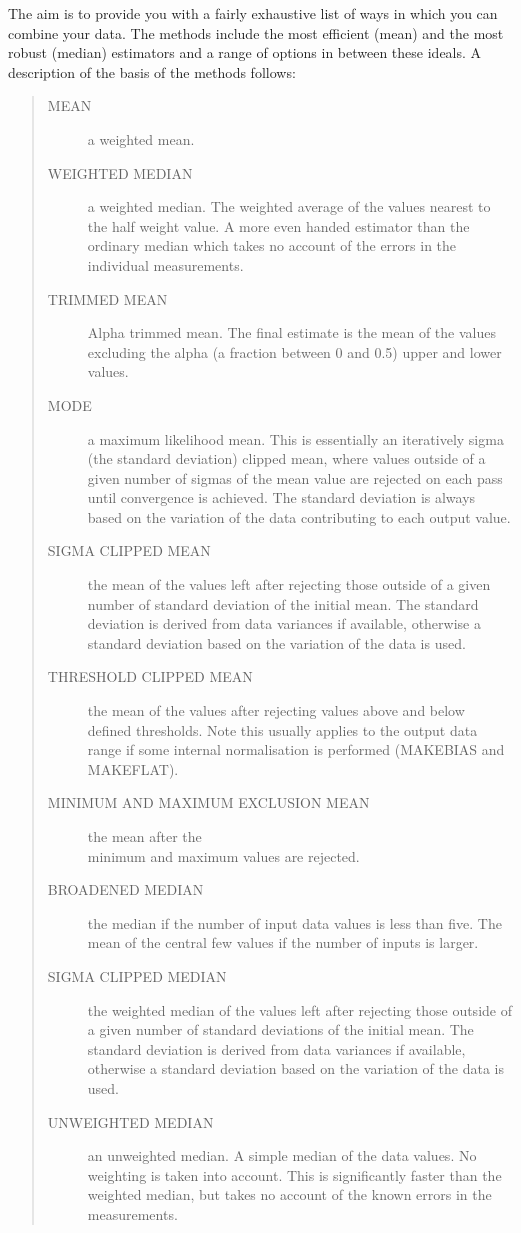 \documentclass[twoside,11pt]{article}
\newcommand{\htmlref}[2]{#1}
\renewcommand{\_}{\texttt{\symbol{95}}}
\newenvironment{myquote}{\begin{quote}\begin{small}}{\end{small}\end{quote}}
\newcommand{\xroutine}[1]{\htmlref{{\sc #1}}{#1}}
\begin{document}
The aim is to provide you with a fairly exhaustive list of ways in which
you can combine your data. The methods include the most efficient
(mean) and the most robust (median) estimators and a range of options
in between these ideals. A description of the basis of the methods
follows:
\begin{myquote}
\begin{description}
\item[MEAN] a weighted mean.
\item[WEIGHTED MEDIAN] a weighted median. The weighted average of the
values nearest to the half weight value. A more even handed estimator
than the ordinary median which takes no account of the errors in the
individual measurements.
\item[TRIMMED MEAN] Alpha trimmed mean. The final estimate is the mean of the
values excluding the alpha (a fraction between 0 and 0.5) upper and lower
values.
\item[MODE] a maximum likelihood mean. This is essentially an
iteratively sigma (the standard deviation) clipped mean, where values
outside of a given number of sigmas of the mean value are rejected on
each pass until convergence is achieved. The standard deviation is always
based on the variation of the data contributing to each output value.
\item[SIGMA CLIPPED MEAN]  the mean of the values left after rejecting those
outside of a given number of standard deviation of the initial mean. The
standard deviation is derived from data variances if available, otherwise
a standard deviation based on the variation of the data is used.
\item[THRESHOLD CLIPPED MEAN] the mean of the values after rejecting
values above and below defined thresholds. Note this usually applies to
the output data range if some internal normalisation is performed
(\xroutine{MAKEBIAS} and
\xroutine{MAKEFLAT}).
\item[MINIMUM AND MAXIMUM EXCLUSION MEAN] the mean after the \\ minimum and
maximum values are rejected.
\item[BROADENED MEDIAN] the median if the number of input data values is
less than five. The mean of the central few values if the number of inputs is
larger.
\item[SIGMA CLIPPED MEDIAN]  the weighted median of the values left
after rejecting those outside of a given number of standard deviations
of the initial mean. The standard deviation is derived from data
variances if available, otherwise a standard deviation based on the
variation of the data is used.
\item[UNWEIGHTED MEDIAN] an unweighted median. A simple median of the 
data values. No weighting is taken into account. This is significantly 
faster than the weighted median, but takes no account of the known
errors in the measurements.
\end{description}
\end{myquote}
\end{document}
